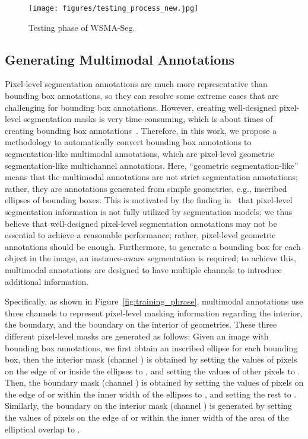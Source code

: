\documentclass{article}
\begin{document}
\begin{figure}[!t]
\vspace{-0.5em}
  \centering
     \texttt{[image: figures/testing\_process\_new.jpg]}
     \caption{Testing phase of WSMA-Seg.\label{fig:testing_phrase}}
		\vspace{-1.5em}
\end{figure}


\subsection{Generating Multimodal Annotations}

Pixel-level segmentation annotations are much more representative than bounding box annotations, so they can resolve some extreme cases that are challenging for bounding box annotations. However, creating well-designed pixel-level segmentation masks is very time-consuming, which is about  times of creating bounding box annotations~\cite{lin2014microsoft}. Therefore, in this work, we propose a methodology to automatically convert  bounding box annotations to segmentation-like multimodal annotations, which are pixel-level geometric segmentation-like multichannel annotations. Here, ``geometric segmentation-like'' means that the multimodal annotations are not strict segmentation annotations; rather, they are annotations generated from simple geometries, e.g., inscribed ellipses of bounding boxes. This is motivated by the finding in~\cite{dai2015boxsup} that  pixel-level segmentation information is not fully utilized by segmentation models; we thus believe that  well-designed pixel-level segmentation annotations may not be essential to achieve a reasonable performance; rather,  pixel-level geometric annotations should be enough. Furthermore, to generate a bounding box for each object in the image, an instance-aware segmentation is required; to achieve this, multimodal annotations are designed to have multiple channels to introduce additional information.

Specifically, as shown in Figure~\ref{fig:training_phrase}, multimodal annotations use three channels to represent pixel-level masking information regarding the interior, the boundary, and the boundary on the interior of geometries. These three different pixel-level masks are generated as follows: Given an image with bounding box annotations, we first obtain an inscribed ellipse for each bounding box, then the interior mask (channel ) is obtained by setting the values of pixels on the edge of or inside the ellipses to , and setting the values of other pixels to . Then, the boundary mask (channel ) is obtained by setting the values of pixels on the edge of or within the inner width  of the ellipses to , and setting the rest to . Similarly, the boundary on the interior mask (channel ) is generated by setting the values of pixels on the edge of or within the inner width  of the area of the elliptical overlap to .
\end{document}
